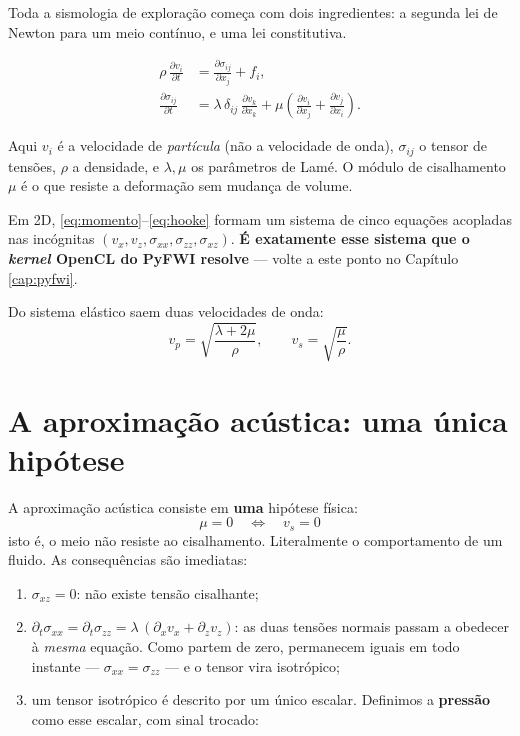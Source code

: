 \documentclass[11pt,a4paper,oneside]{report}
\begin{document}
Toda a sismologia de exploração começa com dois ingredientes: a segunda lei de
Newton para um meio contínuo, e uma lei constitutiva.

\begin{align}
\rho\,\frac{\partial v_i}{\partial t}
  &= \frac{\partial \sigma_{ij}}{\partial x_j} + f_i ,
  \label{eq:momento}\\[4pt]
\frac{\partial \sigma_{ij}}{\partial t}
  &= \lambda\,\delta_{ij}\,\frac{\partial v_k}{\partial x_k}
   + \mu\left(\frac{\partial v_i}{\partial x_j}
            + \frac{\partial v_j}{\partial x_i}\right).
  \label{eq:hooke}
\end{align}

Aqui $v_i$ é a velocidade de \emph{partícula} (não a velocidade de onda),
$\sigma_{ij}$ o tensor de tensões, $\rho$ a densidade, e $\lambda,\mu$ os
parâmetros de Lamé. O módulo de cisalhamento $\mu$ é o que resiste a
deformação sem mudança de volume.

Em 2D, \eqref{eq:momento}--\eqref{eq:hooke} formam um sistema de cinco
equações acopladas nas incógnitas
$(v_x, v_z, \sigma_{xx}, \sigma_{zz}, \sigma_{xz})$. \textbf{É exatamente esse
sistema que o \emph{kernel} OpenCL do PyFWI resolve} --- volte a este ponto no
Capítulo \ref{cap:pyfwi}.

Do sistema elástico saem duas velocidades de onda:
\begin{equation}
v_p = \sqrt{\frac{\lambda + 2\mu}{\rho}}, \qquad
v_s = \sqrt{\frac{\mu}{\rho}} .
\end{equation}

\section{A aproximação acústica: uma única hipótese}

A aproximação acústica consiste em \textbf{uma} hipótese física:
\begin{equation}
\boxed{\;\mu = 0 \quad \Longleftrightarrow \quad v_s = 0\;}
\label{eq:hipotese}
\end{equation}
isto é, o meio não resiste ao cisalhamento. Literalmente o comportamento de um
fluido. As consequências são imediatas:

\begin{enumerate}[leftmargin=*]
\item $\sigma_{xz} = 0$: não existe tensão cisalhante;
\item $\partial_t\sigma_{xx} = \partial_t\sigma_{zz}
 = \lambda\,(\partial_x v_x + \partial_z v_z)$: as duas tensões normais passam a
obedecer à \emph{mesma} equação. Como partem de zero, permanecem iguais em todo
instante --- $\sigma_{xx} = \sigma_{zz}$ --- e o tensor vira isotrópico;
\item um tensor isotrópico é descrito por um único escalar. Definimos a
\textbf{pressão} como esse escalar, com sinal trocado:
\end{enumerate}
\end{document}
